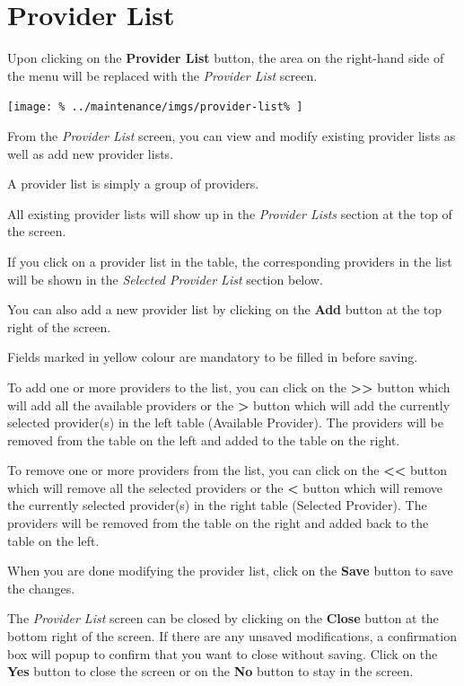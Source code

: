 \documentclass[../main/main]{subfiles}
\begin{document}
\newpage
\section{Provider List}
\label{sec:provider-list}

Upon clicking on the \textbf{Provider List} button,
the area on the right-hand side of the menu will be replaced with the
\emph{Provider List} screen.

\texttt{[image: \%
  ../maintenance/imgs/provider-list\%
]}

From the \emph{Provider List} screen, you can view and modify existing provider
lists as well as add new provider lists.

A provider list is simply a group of providers.

All existing provider lists will show up in the \emph{Provider Lists} section
at the top of the screen.

If you click on a provider list in the table, the corresponding providers in
the list will be shown in the \emph{Selected Provider List} section below.

You can also add a new provider list by clicking on the \textbf{Add} button at
the top right of the screen.

Fields marked in yellow colour are mandatory to be filled in before saving.

To add one or more providers to the list, you can click on the \textbf{>>}
button which will add all the available providers or the \textbf{>} button
which will add the currently selected provider(s) in the left table (Available
Provider). The providers will be removed from the table on the left and added to
the table on the right.

\pagebreak
To remove one or more providers from the list, you can click on the
\textbf{<<} button which will remove all the selected providers or the
\textbf{<} button which will remove the currently selected provider(s) in the
right table (Selected Provider). The providers will be removed from the table
on the right and added back to the table on the left.

When you are done modifying the provider list, click on the \textbf{Save}
button to save the changes.

The \emph{Provider List} screen can be closed by clicking on the
\textbf{Close} button at the bottom right of the screen. If there are any
unsaved modifications, a confirmation box will popup to confirm that you want
to close without saving. Click on the \textbf{Yes} button to close the screen
or on the \textbf{No} button to stay in the screen.
\end{document}
